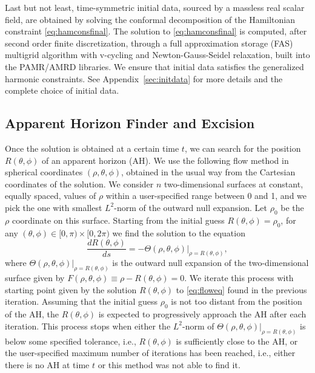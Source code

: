\documentclass[a4paper,11pt]{article}
\numberwithin{equation}{section}
\begin{document}
Last but not least, time-symmetric initial data, sourced by a massless real scalar field, are obtained by solving the conformal decomposition of the Hamiltonian constraint \eqref{eq:hamconsfinal}. 
The solution to \eqref{eq:hamconsfinal} is computed, after second order finite discretization, through a full approximation storage (FAS) multigrid algorithm with v-cycling and Newton-Gauss-Seidel relaxation, built into the PAMR/AMRD libraries. We ensure that initial data satisfies the generalized harmonic constraints. See Appendix~\ref{sec:initdata} for more details and the complete choice of initial data.

\subsection{Apparent Horizon Finder and Excision}
\label{sec:AH_exc}

Once the solution is obtained at a certain time $t$, we can search for the position $R(\theta,\phi)$ of an apparent horizon (AH). We  use the following flow method in spherical coordinates $(\rho,\theta,\phi)$, obtained in the usual way from the Cartesian coordinates of the solution. We consider $n$ two-dimensional surfaces at constant, equally spaced, values of $\rho$ within a user-specified range between 0 and 1, and we pick the one with smallest $L^2$-norm of the outward null expansion. Let $\rho_0$ be the $\rho$ coordinate on this surface. 
Starting from the initial guess $R(\theta,\phi)=\rho_0$, for any $(\theta,\phi)\in [0,\pi)\times [0,2\pi)$ we find the solution to the equation
\begin{equation}
\label{eq:floweq}
\frac{dR(\theta,\phi)}{d s}=-\Theta(\rho,\theta,\phi)|_{\rho=R(\theta,\phi)},
\end{equation}
where $\Theta(\rho,\theta,\phi)|_{\rho=R(\theta,\phi)}$ is the outward null expansion of the two-dimensional surface given by $F(\rho,\theta,\phi)\equiv\rho-R(\theta,\phi)=0$. We iterate this process with starting point given by the solution $R(\theta,\phi)$ to \eqref{eq:floweq} found in the previous iteration. Assuming that the initial guess $\rho_0$ is not too distant from the position of the AH, the $R(\theta,\phi)$ is expected to progressively approach the AH after each iteration. 
This process stops when either the $L^2$-norm of $\Theta(\rho,\theta,\phi)|_{\rho=R(\theta,\phi)}$ is below some specified tolerance, i.e., $R(\theta,\phi)$ is sufficiently close to the AH, or the user-specified maximum number of iterations has been reached, i.e., either there is no AH at time $t$ or this method was not able to find it. 
\end{document}

